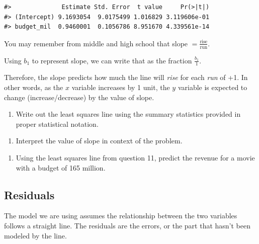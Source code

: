 \documentclass[
]{report}
\providecommand{\tightlist}{%
  \setlength{\itemsep}{0pt}\setlength{\parskip}{0pt}}
\begin{document}
\begin{verbatim}
#>              Estimate Std. Error  t value     Pr(>|t|)
#> (Intercept) 9.1693054  9.0175499 1.016829 3.119606e-01
#> budget_mil  0.9460001  0.1056786 8.951670 4.339561e-14
\end{verbatim}

You may remember from middle and high school that slope \(=\frac{\mbox{rise}}{\mbox{run}}\).

Using \(b_1\) to represent slope, we can write that as the fraction \(\frac{b_1}{1}\).

Therefore, the slope predicts how much the line will \emph{rise} for each \emph{run} of +1. In other words, as the \(x\) variable increases by 1 unit, the \(y\) variable is expected to change (increase/decrease) by the value of slope.

\begin{enumerate}
\def\labelenumi{\arabic{enumi}.}
\setcounter{enumi}{10}
\tightlist
\item
  Write out the least squares line using the summary statistics provided in proper statistical notation.
\end{enumerate}

\vspace{.6in}

\begin{enumerate}
\def\labelenumi{\arabic{enumi}.}
\setcounter{enumi}{11}
\tightlist
\item
  Interpret the value of slope in context of the problem.
\end{enumerate}

\vspace{1in}

\begin{enumerate}
\def\labelenumi{\arabic{enumi}.}
\setcounter{enumi}{12}
\tightlist
\item
  Using the least squares line from question 11, predict the revenue for a movie with a budget of 165 million.
\end{enumerate}

\vspace{.6in}

\hypertarget{residuals}{%
\subsection*{Residuals}\label{residuals}}

The model we are using assumes the relationship between the two variables follows a straight line. The residuals are the errors, or the part that hasn't been modeled by the line.
\end{document}

